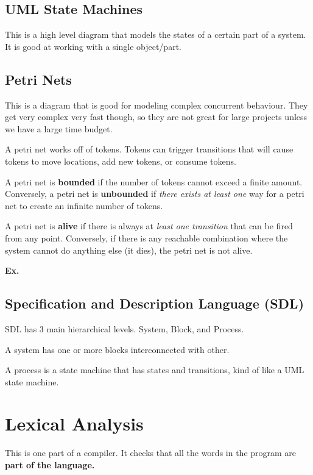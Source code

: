 \documentclass[12pt,letterpaper]{article} \usepackage{amsmath} \usepackage{graphicx} \usepackage[margin=1in]{geometry} \usepackage{longtable}  \usepackage{amssymb}
\begin{document}
	\subsection{UML State Machines}
	This is a high level diagram that models the states of a certain part of a system. It is good at working with a single object/part. 
	
	\subsection{Petri Nets}
	This is a diagram that is good for modeling complex concurrent behaviour. They get very complex very fast though, so they are not great for large projects unless we have a large time budget. 
	
	A petri net works off of tokens. Tokens can trigger transitions that will cause tokens to move locations, add new tokens, or consume tokens. 
	
	A petri net is \textbf{bounded} if the number of tokens cannot exceed a finite amount. Conversely, a petri net is \textbf{unbounded} if \textit{there exists at least one} way for a petri net to create an infinite number of tokens. 
	
	A petri net is \textbf{alive} if there is always at \textit{least one transition } that can be fired from any point. Conversely, if there is any reachable combination where the system cannot do anything else (it dies), the petri net is not alive. 
	
	\begin{mdframed}
		\textbf{Ex. }
	\end{mdframed}
	
	\subsection{Specification and Description Language (SDL)}
	SDL has 3 main hierarchical levels. System, Block, and Process. 
	
	A system has one or more blocks interconnected with other. 
	
	A process is a state machine that has states and transitions, kind of like a UML state machine. 
	
	\section{Lexical Analysis}
	This is one part of a compiler. It checks that all the words in the program are \textbf{part of the language. }
	
\end{document}
